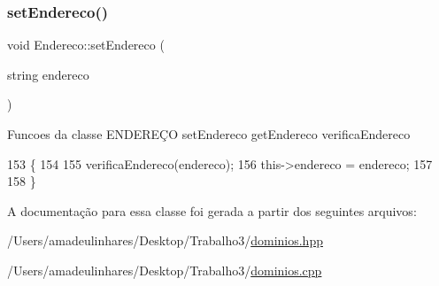 \subsubsection{\texorpdfstring{set\+Endereco()}{setEndereco()}}
{\footnotesize\ttfamily void Endereco\+::set\+Endereco (\begin{DoxyParamCaption}\item[{string}]{endereco }\end{DoxyParamCaption})}

Funcoes da classe E\+N\+D\+E\+R\+EÇO set\+Endereco get\+Endereco verifica\+Endereco 
\begin{DoxyCode}
153 \{
154 
155     verificaEndereco(endereco);
156     this->endereco = endereco;
157 
158 \}
\end{DoxyCode}


A documentação para essa classe foi gerada a partir dos seguintes arquivos\+:\begin{DoxyCompactItemize}
\item 
/\+Users/amadeulinhares/\+Desktop/\+Trabalho3/\mbox{\hyperlink{dominios_8hpp}{dominios.\+hpp}}\item 
/\+Users/amadeulinhares/\+Desktop/\+Trabalho3/\mbox{\hyperlink{dominios_8cpp}{dominios.\+cpp}}\end{DoxyCompactItemize}
